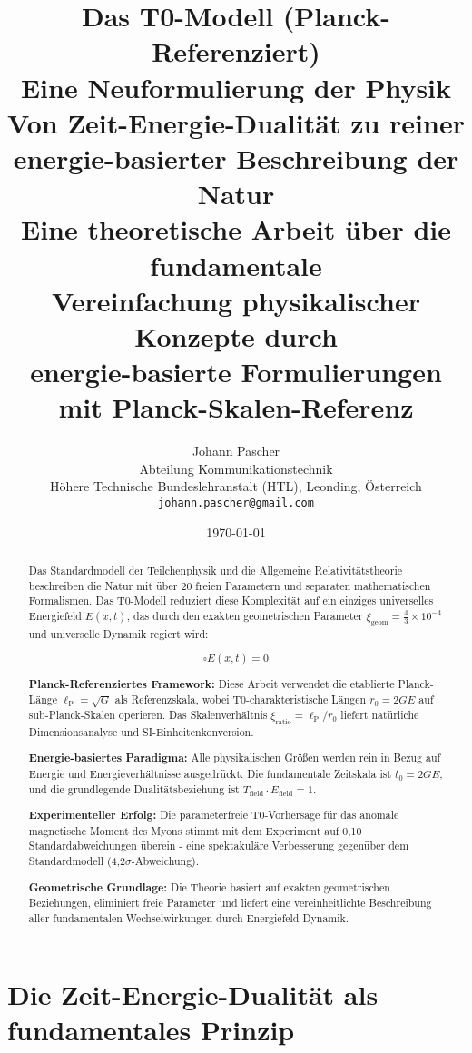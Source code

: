 \documentclass[12pt,a4paper]{report}
\title{
	{\Huge Das T0-Modell (Planck-Referenziert)}\\
	{\LARGE Eine Neuformulierung der Physik}\\
	{\Large Von Zeit-Energie-Dualität zu reiner\\energie-basierter Beschreibung der Natur}\\
	\vspace{1cm}
	{\large Eine theoretische Arbeit über die fundamentale\\Vereinfachung physikalischer Konzepte durch\\energie-basierte Formulierungen mit Planck-Skalen-Referenz}
}
\author{
	{\Large Johann Pascher}\\
	Abteilung Kommunikationstechnik\\
	Höhere Technische Bundeslehranstalt (HTL), Leonding, Österreich\\
	\texttt{johann.pascher@gmail.com}
}
\date{\today}
\newcommand{\Efield}{E(x,t)}              %
\newcommand{\lP}{\ell_{\text{P}}}         %
\newcommand{\rzero}{r_0}                  %
\newcommand{\tzero}{t_0}                  %
\newcommand{\xigeom}{\xi_{\text{geom}}}   %
\newcommand{\xirat}{\xi_{\text{ratio}}}   %
\begin{document}
	
	\maketitle
	
	\begin{abstract}
		Das Standardmodell der Teilchenphysik und die Allgemeine Relativitätstheorie beschreiben die Natur mit über 20 freien Parametern und separaten mathematischen Formalismen. Das T0-Modell reduziert diese Komplexität auf ein einziges universelles Energiefeld $\Efield$, das durch den exakten geometrischen Parameter $\xigeom = \frac{4}{3} \times 10^{-4}$ und universelle Dynamik regiert wird:
		
		\begin{equation}
			\square \Efield = 0
		\end{equation}
		
		\textbf{Planck-Referenziertes Framework:} Diese Arbeit verwendet die etablierte Planck-Länge $\lP = \sqrt{G}$ als Referenzskala, wobei T0-charakteristische Längen $\rzero = 2GE$ auf sub-Planck-Skalen operieren. Das Skalenverhältnis $\xirat = \lP/\rzero$ liefert natürliche Dimensionsanalyse und SI-Einheitenkonversion.
		
		\textbf{Energie-basiertes Paradigma:} Alle physikalischen Größen werden rein in Bezug auf Energie und Energieverhältnisse ausgedrückt. Die fundamentale Zeitskala ist $\tzero = 2GE$, und die grundlegende Dualitätsbeziehung ist $T_{\text{field}} \cdot E_{\text{field}} = 1$.
		
		\textbf{Experimenteller Erfolg:} Die parameterfreie T0-Vorhersage für das anomale magnetische Moment des Myons stimmt mit dem Experiment auf 0,10 Standardabweichungen überein - eine spektakuläre Verbesserung gegenüber dem Standardmodell (4,2$\sigma$-Abweichung).
		
		\textbf{Geometrische Grundlage:} Die Theorie basiert auf exakten geometrischen Beziehungen, eliminiert freie Parameter und liefert eine vereinheitlichte Beschreibung aller fundamentalen Wechselwirkungen durch Energiefeld-Dynamik.
	\end{abstract}
	
	\tableofcontents
	
	\chapter{Die Zeit-Energie-Dualität als fundamentales Prinzip}\label{chap:time_energy_duality}
	
\end{document}
